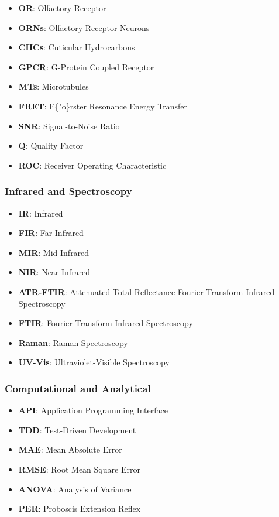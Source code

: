 \documentclass[
  13pt,
  a4paperpaper,
  12pt]{article}
\providecommand{\tightlist}{%
  \setlength{\itemsep}{0pt}\setlength{\parskip}{0pt}}
\begin{document}
\begin{itemize}
\tightlist
\item
  \textbf{OR}: Olfactory Receptor
\item
  \textbf{ORNs}: Olfactory Receptor Neurons
\item
  \textbf{CHCs}: Cuticular Hydrocarbons
\item
  \textbf{GPCR}: G-Protein Coupled Receptor
\item
  \textbf{MTs}: Microtubules
\item
  \textbf{FRET}: F\{"o\}rster Resonance Energy Transfer
\item
  \textbf{SNR}: Signal-to-Noise Ratio
\item
  \textbf{Q}: Quality Factor
\item
  \textbf{ROC}: Receiver Operating Characteristic
\end{itemize}

\subsubsection{Infrared and
Spectroscopy}\label{infrared-and-spectroscopy}

\begin{itemize}
\tightlist
\item
  \textbf{IR}: Infrared
\item
  \textbf{FIR}: Far Infrared
\item
  \textbf{MIR}: Mid Infrared
\item
  \textbf{NIR}: Near Infrared
\item
  \textbf{ATR-FTIR}: Attenuated Total Reflectance Fourier Transform
  Infrared Spectroscopy
\item
  \textbf{FTIR}: Fourier Transform Infrared Spectroscopy
\item
  \textbf{Raman}: Raman Spectroscopy
\item
  \textbf{UV-Vis}: Ultraviolet-Visible Spectroscopy
\end{itemize}

\subsubsection{Computational and
Analytical}\label{computational-and-analytical}

\begin{itemize}
\tightlist
\item
  \textbf{API}: Application Programming Interface
\item
  \textbf{TDD}: Test-Driven Development
\item
  \textbf{MAE}: Mean Absolute Error
\item
  \textbf{RMSE}: Root Mean Square Error
\item
  \textbf{ANOVA}: Analysis of Variance
\item
  \textbf{PER}: Proboscis Extension Reflex
\end{itemize}
\end{document}
